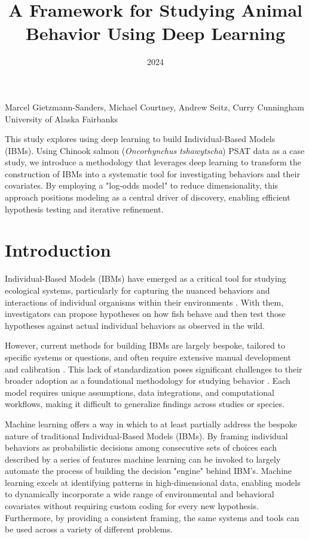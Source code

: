 \documentclass[11pt]{article}
\title{A Framework for Studying Animal Behavior Using Deep Learning}
\date{2024}
\makeatletter
\renewcommand{\maketitle}{
\begin{center}

\pagestyle{empty}

{\LARGE \bf \@title\par}
\vspace{1cm}

{\Large Marcel Gietzmann-Sanders, Michael Courtney, Andrew Seitz, Curry Cunningham}\\[1cm]

University of Alaska Fairbanks


\end{center}
}\makeatother
\makeatother
\begin{document}
\maketitle


\begin{center}
This study explores using deep learning to build Individual-Based Models (IBMs). Using Chinook salmon (\textit{Oncorhynchus tshawytscha}) PSAT data as a case study, we introduce a methodology that leverages deep learning to transform the construction of IBMs into a systematic tool for investigating behaviors and their covariates. By employing a "log-odds model" to reduce dimensionality, this approach positions modeling as a central driver of discovery, enabling efficient hypothesis testing and iterative refinement.
\end{center}



\section*{Introduction}

Individual-Based Models (IBMs) have emerged as a critical tool for studying ecological systems, particularly for capturing the nuanced behaviors and interactions of individual organisms within their environments \citep{grimm}. With them, investigators can propose hypotheses on how fish behave and then test those hypotheses against actual individual behaviors as observed in the wild.

However, current methods for building IBMs are largely bespoke, tailored to specific systems or questions, and often require extensive manual development and calibration \citep{grimm}. This lack of standardization poses significant challenges to their broader adoption as a foundational methodology for studying behavior \citep{grimm}. Each model requires unique assumptions, data integrations, and computational workflows, making it difficult to generalize findings across studies or species. 

Machine learning offers a way in which to at least partially address the bespoke nature of traditional Individual-Based Models (IBMs). By framing individual behaviors as probabilistic decisions among consecutive sets of choices each described by a series of features machine learning can be invoked to largely automate the process of building the decision "engine" behind IBM's. Machine learning excels at identifying patterns in high-dimensional data, enabling models to dynamically incorporate a wide range of environmental and behavioral covariates without requiring custom coding for every new hypothesis. Furthermore, by providing a consistent framing, the same systems and tools can be used across a variety of different problems. 
\end{document}
